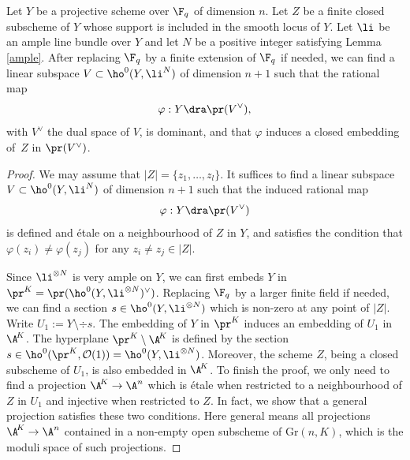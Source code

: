 \begin{lem}
Let $Y$ be a projective scheme over $\F_q$ of dimension $n$. Let $Z$ be a finite closed subscheme of $Y$ whose support is included in the smooth locus of $Y$. Let $\li$ be an ample line bundle over $Y$ and let $N$ be a positive integer satisfying Lemma \ref{ample}. After replacing $\F_q$ by a finite extension of $\F_q$ if needed, we can find a linear subspace $V\subset \ho^0(Y, \li^{N})$ of dimension $n+1$ such that the rational map\vspace*{-3pt}
\[
\varphi: Y \dra \pr(V^{\vee}),
\]
with $V^{\vee}$ the dual space of $V$, is dominant, and that $\varphi$ induces a closed embedding of~$Z$ in $\pr(V^{\vee})$.
\end{lem}
\begin{proof}
We may assume that $|Z|=\{ z_1,\dots, z_l \}$. It suffices to find a linear subspace $V\subset \ho^0(Y, \li^{N})$ of dimension $n+1$ such that the induced rational map
\[
\varphi: Y \dra \pr(V^{\vee})
\]
is defined and étale on a neighbourhood of $Z$ in $Y$, and satisfies the condition that $\varphi(z_i)\not=\varphi(z_j)$ for any $z_i\not=z_j\in |Z|$.

Since $\li^{\otimes N}$ is very ample on $Y$, we can first embeds $Y$ in $\pr^K=\pr(\ho^0(Y, \li^{\otimes N})^{\vee})$. Replacing $\F_q$ by a larger finite field if needed, we can find a section $s\in \ho^0(Y, \li^{\otimes N})$ which is non-zero at any point of $|Z|$. Write $U_1:=Y\setminus\div s$. The embedding of $Y$ in $\pr^K$ induces an embedding of $U_1$ in $\A^{\!K}$. The hyperplane $\pr^K\setminus\A^{\!K}$ is defined by the section $s\in \ho^0(\pr^K, \mathcal{O}(1))=\ho^0(Y, \li^{\otimes N})$. Moreover, the scheme $Z$, being a closed subscheme of $U_1$, is also embedded in $\A^{\!K}$. To finish the proof, we only need to find a projection $\A^{\!K}\to \A^n$ which is étale when restricted to a neighbourhood of $Z$ in $U_1$ and injective when restricted to $Z$. In fact, we show that a general projection satisfies these two conditions. Here general means all projections $\A^{\!K}\to \A^n$ contained in a non-empty open subscheme of $\mathrm{Gr}(n, K)$, which is the moduli space of such projections.


\end{proof}

